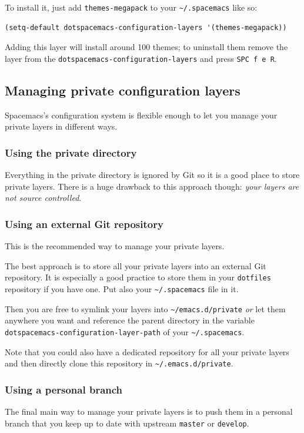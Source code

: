 \documentclass[11pt]{article}
\begin{document}
To install it, just add \texttt{themes-megapack} to your \texttt{\textasciitilde{}/.spacemacs} like so:

\begin{verbatim}
(setq-default dotspacemacs-configuration-layers '(themes-megapack))
\end{verbatim}

Adding this layer will install around 100 themes; to uninstall them remove the
layer from the \texttt{dotspacemacs-configuration-layers} and press \texttt{SPC f e R}.

\subsection{Managing private configuration layers}
\label{sec:orgba0847d}
Spacemacs's configuration system is flexible enough to let you manage your
private layers in different ways.

\subsubsection{Using the private directory}
\label{sec:orgf3c7a51}
Everything in the private directory is ignored by Git so it is a good place to
store private layers. There is a huge drawback to this approach though: \emph{your
layers are not source controlled}.

\subsubsection{Using an external Git repository}
\label{sec:org25eccaa}
This is the recommended way to manage your private layers.

The best approach is to store all your private layers into an external Git
repository. It is especially a good practice to store them in your \texttt{dotfiles}
repository if you have one. Put also your \texttt{\textasciitilde{}/.spacemacs} file in it.

Then you are free to symlink your layers into \texttt{\textasciitilde{}/emacs.d/private} \emph{or} let them
anywhere you want and reference the parent directory in the variable
\texttt{dotspacemacs-configuration-layer-path} of your \texttt{\textasciitilde{}/.spacemacs}.

Note that you could also have a dedicated repository for all your private layers
and then directly clone this repository in \texttt{\textasciitilde{}/.emacs.d/private}.

\subsubsection{Using a personal branch}
\label{sec:org6ca380e}
The final main way to manage your private layers is to push them in a personal
branch that you keep up to date with upstream \texttt{master} or \texttt{develop}.
\end{document}
